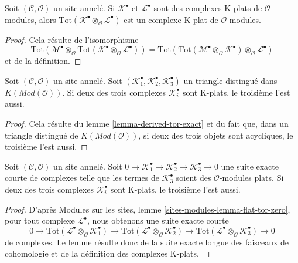 \begin{lemma}
\label{lemma-tensor-product-K-flat}
Soit $(\mathcal{C}, \mathcal{O})$ un site annelé.
Si $\mathcal{K}^\bullet$ et $\mathcal{L}^\bullet$ sont des complexes K-plats
de $\mathcal{O}$-modules, alors
$\text{Tot}(\mathcal{K}^\bullet \otimes_\mathcal{O} \mathcal{L}^\bullet)$
est un complexe K-plat de $\mathcal{O}$-modules.
\end{lemma}

\begin{proof}
Cela résulte de l'isomorphisme
$$
\text{Tot}(\mathcal{M}^\bullet \otimes_\mathcal{O}
\text{Tot}(\mathcal{K}^\bullet \otimes_\mathcal{O} \mathcal{L}^\bullet))
=
\text{Tot}(\text{Tot}(\mathcal{M}^\bullet \otimes_\mathcal{O}
\mathcal{K}^\bullet) \otimes_\mathcal{O} \mathcal{L}^\bullet)
$$
et de la définition.
\end{proof}

\begin{lemma}
\label{lemma-K-flat-two-out-of-three}
Soit $(\mathcal{C}, \mathcal{O})$ un site annelé.
Soit $(\mathcal{K}_1^\bullet, \mathcal{K}_2^\bullet, \mathcal{K}_3^\bullet)$
un triangle distingué dans $K(\textit{Mod}(\mathcal{O}))$.
Si deux des trois complexes $\mathcal{K}_i^\bullet$ sont K-plats, le
troisième l'est aussi.
\end{lemma}

\begin{proof}
Cela résulte du lemme \ref{lemma-derived-tor-exact} et du fait que, dans un
triangle distingué de $K(\textit{Mod}(\mathcal{O}))$, si deux des trois objets
sont acycliques, le troisième l'est aussi.
\end{proof}

\begin{lemma}
\label{lemma-K-flat-two-out-of-three-ses}
Soit $(\mathcal{C}, \mathcal{O})$ un site annelé. Soit
$0 \to \mathcal{K}_1^\bullet \to \mathcal{K}_2^\bullet \to
\mathcal{K}_3^\bullet \to 0$ une suite exacte courte de complexes telle que
les termes de $\mathcal{K}_3^\bullet$ soient des $\mathcal{O}$-modules plats.
Si deux des trois complexes $\mathcal{K}_i^\bullet$ sont K-plats, le troisième
l'est aussi.
\end{lemma}

\begin{proof}
D'après Modules sur les sites,
lemme \ref{sites-modules-lemma-flat-tor-zero}, pour tout complexe
$\mathcal{L}^\bullet$, nous obtenons une suite exacte courte
$$
0 \to
\text{Tot}(\mathcal{L}^\bullet \otimes_\mathcal{O} \mathcal{K}_1^\bullet) \to
\text{Tot}(\mathcal{L}^\bullet \otimes_\mathcal{O} \mathcal{K}_2^\bullet) \to
\text{Tot}(\mathcal{L}^\bullet \otimes_\mathcal{O} \mathcal{K}_3^\bullet) \to 0
$$
de complexes. Le lemme résulte donc de la suite exacte longue des faisceaux de
cohomologie et de la définition des complexes K-plats.
\end{proof}

